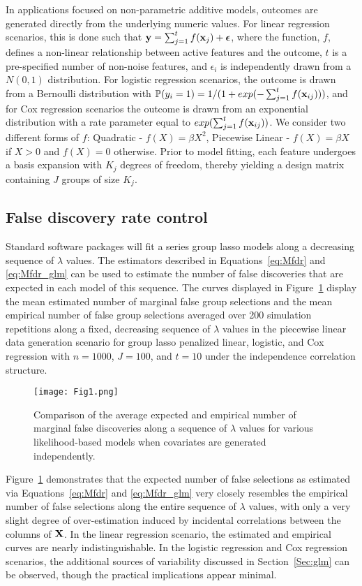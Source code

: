 In applications focused on non-parametric additive models, outcomes are generated directly from the underlying numeric values.  For linear regression scenarios, this is done such that $\mathbf{y} = \sum_{j = 1}^{t} f(\mathbf{x}_j) + \boldsymbol{\epsilon}$, where the function, $f$, defines a non-linear relationship between active features and the outcome, $t$ is a pre-specified number of non-noise features, and $\epsilon_i$ is independently drawn from a $N(0,1)$ distribution. For logistic regression scenarios, the outcome is drawn from a Bernoulli distribution with $\mathbb{P}(y_i = 1) = 1/(1 + exp(- \sum_{j = 1}^{t} f(\mathbf{x}_{ij})))$, and for Cox regression scenarios the outcome is drawn from an exponential distribution with a rate parameter equal to $exp(\sum_{j = 1}^{t} f(\mathbf{x}_{ij}))$. We consider two different forms of $f$: Quadratic - $f(X) = \beta X^2$, Piecewise Linear - $f(X) = \beta X$ if $X > 0$ and $f(X) = 0$ otherwise. Prior to model fitting, each feature undergoes a basis expansion with $K_j$ degrees of freedom, thereby yielding a design matrix containing $J$ groups of size $K_j$.

\subsection{False discovery rate control}

Standard software packages will fit a series group lasso models along a decreasing sequence of $\lambda$ values.  The estimators described in Equations~\ref{eq:Mfdr} and \ref{eq:Mfdr_glm} can be used to estimate the number of false discoveries that are expected in each model of this sequence. The curves displayed in Figure~\ref{Fig:lseq1} display the mean estimated number of marginal false group selections and the mean empirical number of false group selections averaged over 200 simulation repetitions along a fixed, decreasing sequence of $\lambda$ values in the piecewise linear data generation scenario for group lasso penalized linear, logistic, and Cox regression with $n = 1000$, $J = 100$, and $t = 10$ under the independence correlation structure. 

\begin{figure} [!htb]
\centering
\texttt{[image: Fig1.png]}
\caption{\label{Fig:lseq1} Comparison of the average expected and empirical number of marginal false discoveries along a sequence of $\lambda$ values for various likelihood-based models when covariates are generated independently.}
\end{figure}

Figure~\ref{Fig:lseq1} demonstrates that the expected number of false selections as estimated via Equations~\ref{eq:Mfdr} and \ref{eq:Mfdr_glm} very closely resembles the empirical number of false selections along the entire sequence of $\lambda$ values, with only a very slight degree of over-estimation induced by incidental correlations between the columns of $\mathbf{X}$. In the linear regression scenario, the estimated and empirical curves are nearly indistinguishable. In the logistic regression and Cox regression scenarios, the additional sources of variability discussed in Section~\ref{Sec:glm} can be observed, though the practical implications appear minimal.

